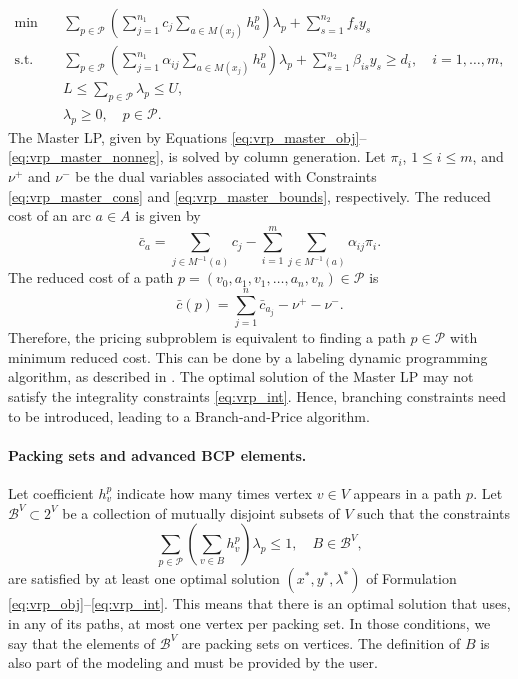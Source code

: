 \documentclass[3p, authoryear, 11pt]{elsarticle}
\begin{document}
\begin{align}
\min \quad & \sum_{p\in \mathcal{P}} \left( \sum_{j=1}^{n_1} c_j \sum_{a\in M(x_j)} h_a^p \right) \lambda_p + \sum_{s=1}^{n_2} f_s y_s \label{eq:vrp_master_obj}\\
\text{s.t.}\quad & \sum_{p\in \mathcal{P}} \left( \sum_{j=1}^{n_1} \alpha_{ij} \sum_{a\in M(x_j)} h_a^p \right) \lambda_p + \sum_{s=1}^{n_2} \beta_{is}y_s \ge d_i, \quad i=1,\ldots,m, \label{eq:vrp_master_cons}\\
& L \le \sum_{p\in \mathcal{P}} \lambda_p \le U, \label{eq:vrp_master_bounds}\\
& \lambda_p \ge 0, \quad p\in \mathcal{P}. \label{eq:vrp_master_nonneg}
\end{align}
The Master LP, given by Equations \eqref{eq:vrp_master_obj}--\eqref{eq:vrp_master_nonneg}, is solved by column generation. Let $\pi_i$, $1\le i\le m$, and $\nu^+$ and $\nu^-$ be the dual variables associated with Constraints \eqref{eq:vrp_master_cons} and \eqref{eq:vrp_master_bounds}, respectively. The reduced cost of an arc $a\in A$ is given by
\begin{equation}
\bar{c}_a = \sum_{j\in M^{-1}(a)} c_j - \sum_{i=1}^{m} \sum_{j\in M^{-1}(a)} \alpha_{ij}\pi_i.
\end{equation}
The reduced cost of a path $p=(v_0,a_1,v_1,\ldots,a_n,v_n)\in \mathcal{P}$ is
\begin{equation}
\bar{c}(p) = \sum_{j=1}^{n} \bar{c}_{a_j} - \nu^+ - \nu^-.
\end{equation}
Therefore, the pricing subproblem is equivalent to finding a path $p\in \mathcal{P}$ with minimum reduced cost. This can be done by a labeling dynamic programming algorithm, as described in \citet{sadykov_bucket_2021}. The optimal solution of the Master LP may not satisfy the integrality constraints \eqref{eq:vrp_int}. Hence, branching constraints need to be introduced, leading to a Branch-and-Price algorithm.

\paragraph{Packing sets and advanced BCP elements.} Let coefficient $h_v^p$ indicate how many times vertex $v\in V$ appears in a path $p$. Let $\mathcal{B}^V\subset 2^V$ be a collection of mutually disjoint subsets of $V$ such that the constraints
\begin{equation}
\sum_{p\in \mathcal{P}} \left( \sum_{v\in B} h_v^p \right) \lambda_p \le 1, \quad B\in \mathcal{B}^V,
\label{eq:vrp_packing}
\end{equation}
are satisfied by at least one optimal solution $(x^*,y^*,\lambda^*)$ of Formulation \eqref{eq:vrp_obj}--\eqref{eq:vrp_int}. This means that there is an optimal solution that uses, in any of its paths, at most one vertex per packing set. In those conditions, we say that the elements of $\mathcal{B}^V$ are packing sets on vertices. The definition of $B$ is also part of the modeling and must be provided by the user.
\end{document}
